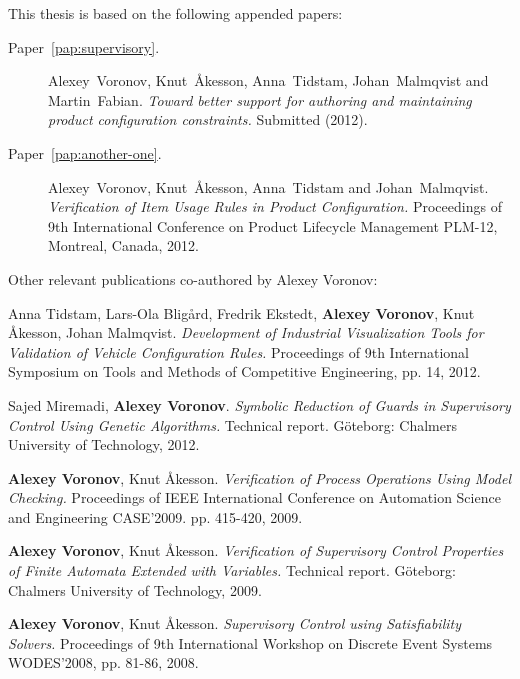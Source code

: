
\begin{refsection}

This thesis is based on the following appended papers:

\begin{description}
\item[Paper~\ref{pap:supervisory}.] Alexey~Voronov, Knut~Åkesson, Anna~Tidstam, Johan~Malmqvist and Martin~Fabian. \emph{Toward better support for authoring and maintaining product configuration constraints.} Submitted (2012).

\item[Paper~\ref{pap:another-one}.] Alexey~Voronov, Knut~Åkesson, Anna~Tidstam and Johan~Malmqvist. \emph{Verification of Item Usage Rules in Product Configuration.} Proceedings of 9th International Conference on Product Lifecycle Management PLM-12, Montreal, Canada, 2012.
\end{description}

\vspace{1cm}

\noindent Other relevant publications co-authored by Alexey Voronov:
\begin{description}
\normalsize
\newcommand{\ME}{{\bfseries Alexey Voronov}}

\item Anna Tidstam, Lars-Ola Bligård, Fredrik Ekstedt, \ME, Knut Åkesson, Johan Malmqvist. \emph{Development of Industrial Visualization Tools for Validation of Vehicle Configuration Rules.} Proceedings of 9th International Symposium on Tools and Methods of Competitive Engineering, pp. 14, 2012.

\item Sajed Miremadi, \ME. \emph{Symbolic Reduction of Guards in Supervisory Control Using Genetic Algorithms.} Technical report. Göteborg: Chalmers University of Technology, 2012.

\item \ME, Knut Åkesson. \emph{Verification of Process Operations Using Model Checking.} Proceedings of IEEE International Conference on Automation Science and Engineering CASE'2009. pp. 415-420, 2009.

\item \ME, Knut Åkesson. \emph{Verification of Supervisory Control Properties of Finite Automata Extended with Variables.} Technical report. Göteborg: Chalmers University of Technology, 2009.

\item \ME, Knut Åkesson. \emph{Supervisory Control using Satisfiability Solvers.} Proceedings of 9th International Workshop on Discrete Event Systems WODES'2008, pp. 81-86, 2008.
\end{description}

\end{refsection}
